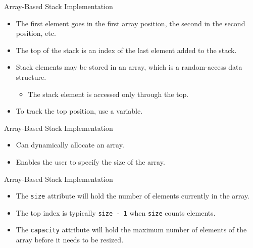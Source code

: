 \documentclass[14pt,aspectratio=1610]{beamer}
\begin{document}

\begin{frame}{Array-Based Stack Implementation}
\begin{itemize}
\item
  The first element goes in the first array position, the second in the second position, etc.
\item
  The top of the stack is an index of the last element added to the stack.
\item
  Stack elements may be stored in an array, which is a random-access data structure.
  \begin{itemize}
  \item
    The stack element is accessed only through the top.
  \end{itemize}
\item
  To track the top position, use a variable.
\end{itemize}

\end{frame}


\begin{frame}{Array-Based Stack Implementation}
\begin{itemize}
\item
  Can dynamically allocate an array.
\item
  Enables the user to specify the size of the array.
\end{itemize}
\end{frame}

\begin{frame}{Array-Based Stack Implementation}
\begin{itemize}
\item
  The \texttt{size} attribute will hold the number of elements currently in the array.
\item
  The top index is typically \texttt{size - 1} when \texttt{size} counts elements.
\item
  The \texttt{capacity} attribute will hold the maximum number of elements of the array before it needs to be resized.
\end{itemize}
\end{frame}
\end{document}
